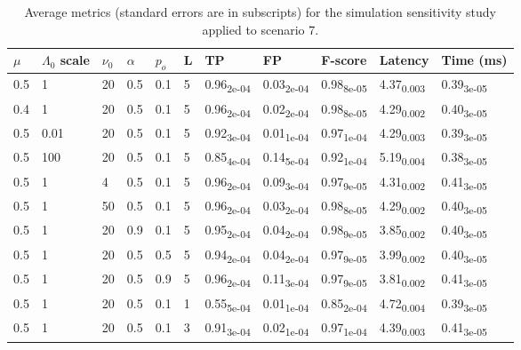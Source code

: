 \begin{table}[H]
\centering
\caption{Average metrics (standard errors are in subscripts) for the simulation sensitivity
study applied to scenario 7.\\} 
\label{tab:sim_sensitivity_results}
\begin{tabular}{lllllllllll}
  \hline
$\mu$ & $\Lambda_0$ scale & $\nu_0$ & $\alpha$ & $p_o$ & L & TP & FP & F-score & Latency & Time (ms) \\ 
  \hline
0.5 & 1 & 20 & 0.5 & 0.1 & 5 & 0.96\textsubscript{2e-04} & 0.03\textsubscript{2e-04} & 0.98\textsubscript{8e-05} & 4.37\textsubscript{0.003} & 0.39\textsubscript{3e-05} \\ 
  0.4 & 1 & 20 & 0.5 & 0.1 & 5 & 0.96\textsubscript{2e-04} & 0.02\textsubscript{2e-04} & 0.98\textsubscript{8e-05} & 4.29\textsubscript{0.002} & 0.40\textsubscript{3e-05} \\ 
  0.5 & 0.01 & 20 & 0.5 & 0.1 & 5 & 0.92\textsubscript{3e-04} & 0.01\textsubscript{1e-04} & 0.97\textsubscript{1e-04} & 4.29\textsubscript{0.003} & 0.39\textsubscript{3e-05} \\ 
  0.5 & 100 & 20 & 0.5 & 0.1 & 5 & 0.85\textsubscript{4e-04} & 0.14\textsubscript{5e-04} & 0.92\textsubscript{1e-04} & 5.19\textsubscript{0.004} & 0.38\textsubscript{3e-05} \\ 
  0.5 & 1 & 4 & 0.5 & 0.1 & 5 & 0.96\textsubscript{2e-04} & 0.09\textsubscript{3e-04} & 0.97\textsubscript{9e-05} & 4.31\textsubscript{0.002} & 0.41\textsubscript{3e-05} \\ 
  0.5 & 1 & 50 & 0.5 & 0.1 & 5 & 0.96\textsubscript{2e-04} & 0.03\textsubscript{2e-04} & 0.98\textsubscript{8e-05} & 4.29\textsubscript{0.002} & 0.40\textsubscript{3e-05} \\ 
  0.5 & 1 & 20 & 0.9 & 0.1 & 5 & 0.95\textsubscript{2e-04} & 0.04\textsubscript{2e-04} & 0.98\textsubscript{9e-05} & 3.85\textsubscript{0.002} & 0.40\textsubscript{3e-05} \\ 
  0.5 & 1 & 20 & 0.5 & 0.5 & 5 & 0.94\textsubscript{2e-04} & 0.04\textsubscript{2e-04} & 0.97\textsubscript{9e-05} & 3.99\textsubscript{0.002} & 0.40\textsubscript{3e-05} \\ 
  0.5 & 1 & 20 & 0.5 & 0.9 & 5 & 0.96\textsubscript{2e-04} & 0.11\textsubscript{3e-04} & 0.97\textsubscript{9e-05} & 3.81\textsubscript{0.002} & 0.41\textsubscript{3e-05} \\ 
  0.5 & 1 & 20 & 0.5 & 0.1 & 1 & 0.55\textsubscript{5e-04} & 0.01\textsubscript{1e-04} & 0.85\textsubscript{2e-04} & 4.72\textsubscript{0.004} & 0.39\textsubscript{3e-05} \\ 
  0.5 & 1 & 20 & 0.5 & 0.1 & 3 & 0.91\textsubscript{3e-04} & 0.02\textsubscript{1e-04} & 0.97\textsubscript{1e-04} & 4.39\textsubscript{0.003} & 0.41\textsubscript{3e-05} \\ 
  \end{tabular}
\end{table}
